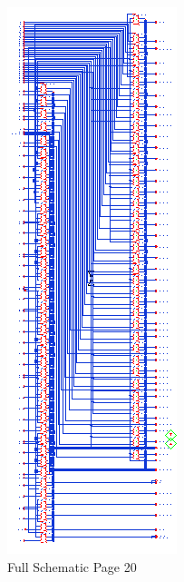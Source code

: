\documentclass[11pt]{article}
\begin{document}
	
	\begin{figure}[H] 
		\centering 
		\includegraphics[width=0.7\linewidth]{"Pictures/Full Schematic Page 20"}
		\caption{Full Schematic Page 20} 
		\label{fig:Full-Schematic-Page-20} 
	\end{figure}
	
\end{document}

